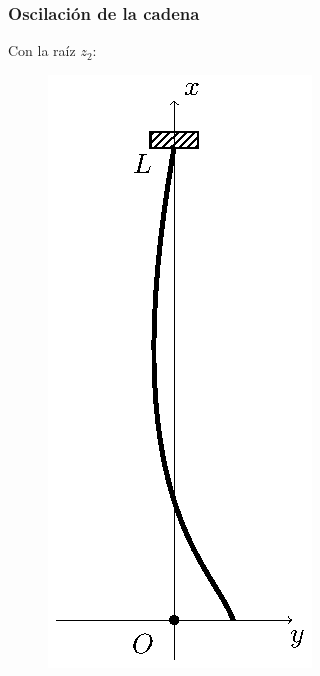 \documentclass[12pt]{beamer}
\begin{document}
\begin{frame}
\frametitle{Oscilación de la cadena}
Con la raíz $z_{2}$:
\begin{figure}[H]
    \centering
    \includegraphics[scale=0.75]{Imagenes/Cadena_Oscilante_04.eps}
\end{figure}
\end{frame}
\end{document}
